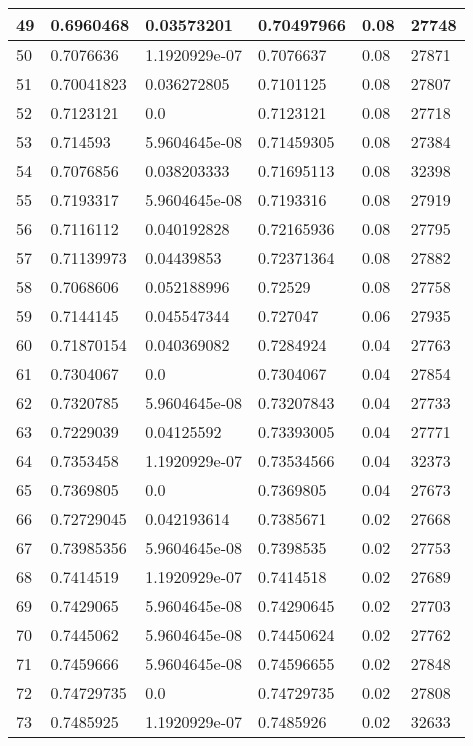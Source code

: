 \begin{longtable}{|l|l|l|l|l|l|}
49 & 0.6960468 & 0.03573201 & 0.70497966 & 0.08 & 27748 \\ \hline 
50 & 0.7076636 & 1.1920929e-07 & 0.7076637 & 0.08 & 27871 \\ \hline 
51 & 0.70041823 & 0.036272805 & 0.7101125 & 0.08 & 27807 \\ \hline 
52 & 0.7123121 & 0.0 & 0.7123121 & 0.08 & 27718 \\ \hline 
53 & 0.714593 & 5.9604645e-08 & 0.71459305 & 0.08 & 27384 \\ \hline 
54 & 0.7076856 & 0.038203333 & 0.71695113 & 0.08 & 32398 \\ \hline 
55 & 0.7193317 & 5.9604645e-08 & 0.7193316 & 0.08 & 27919 \\ \hline 
56 & 0.7116112 & 0.040192828 & 0.72165936 & 0.08 & 27795 \\ \hline 
57 & 0.71139973 & 0.04439853 & 0.72371364 & 0.08 & 27882 \\ \hline 
58 & 0.7068606 & 0.052188996 & 0.72529 & 0.08 & 27758 \\ \hline 
59 & 0.7144145 & 0.045547344 & 0.727047 & 0.06 & 27935 \\ \hline 
60 & 0.71870154 & 0.040369082 & 0.7284924 & 0.04 & 27763 \\ \hline 
61 & 0.7304067 & 0.0 & 0.7304067 & 0.04 & 27854 \\ \hline 
62 & 0.7320785 & 5.9604645e-08 & 0.73207843 & 0.04 & 27733 \\ \hline 
63 & 0.7229039 & 0.04125592 & 0.73393005 & 0.04 & 27771 \\ \hline 
64 & 0.7353458 & 1.1920929e-07 & 0.73534566 & 0.04 & 32373 \\ \hline 
65 & 0.7369805 & 0.0 & 0.7369805 & 0.04 & 27673 \\ \hline 
66 & 0.72729045 & 0.042193614 & 0.7385671 & 0.02 & 27668 \\ \hline 
67 & 0.73985356 & 5.9604645e-08 & 0.7398535 & 0.02 & 27753 \\ \hline 
68 & 0.7414519 & 1.1920929e-07 & 0.7414518 & 0.02 & 27689 \\ \hline 
69 & 0.7429065 & 5.9604645e-08 & 0.74290645 & 0.02 & 27703 \\ \hline 
70 & 0.7445062 & 5.9604645e-08 & 0.74450624 & 0.02 & 27762 \\ \hline 
71 & 0.7459666 & 5.9604645e-08 & 0.74596655 & 0.02 & 27848 \\ \hline 
72 & 0.74729735 & 0.0 & 0.74729735 & 0.02 & 27808 \\ \hline 
73 & 0.7485925 & 1.1920929e-07 & 0.7485926 & 0.02 & 32633 \\ \hline 

\end{longtable}
